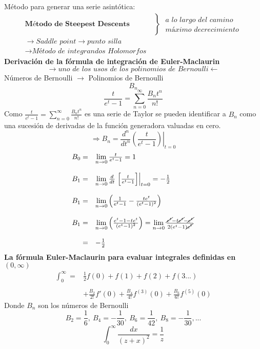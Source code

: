 \documentclass{article}
\theoremstyle{definition}
\begin{document}
Método para generar una serie asintótica:
\[\begin{array}{ll}
	\textbf{Método de Steepest Descents}
	&\left\}\begin{array}{ll}
		\textit{a lo largo del camino}\\
		\textit{máximo decrecimiento}	
	\end{array}\right.\\
	\to \textit{Saddle point}\to \textit{punto silla}\\
	\to \textit{Método de integrandos Holomorfos}
\end{array}\]
\textbf{Derivación de la fórmula de integración de Euler-Maclaurin}
\[\longrightarrow \textit{uno de los usos de los polinomios de Bernoulli}\longleftarrow\]
Números de Bernoulli $\longrightarrow$ Polinomios de Bernoulli
\[B_n\]
\[\frac{t}{e^t-1}=\sum^{\infty}_{n=0}\frac{B_nt^n}{n!}\]
Como $\frac{t}{e^t-1}=\sum^{\infty}_{n=0}\frac{B_nt^n}{n!}$ es una serie de Taylor se pueden identificar a $B_n$ como una sucesión de derivadas de la función generadora valuadas en cero.
\[\Rightarrow B_n=\frac{d^n}{dt^n}\left.\left(\frac{t}{e^t-1}\right)\right|_{t=0}\]
\[
\begin{array}{rl}
	B_0=&\lim\limits_{n\to 0}\frac{t}{e^t-1}=1\\
	\\
	B_1=&\lim\limits_{n\to 0}\frac{d}{dt}\left.\left[\frac{t}{e^t-1}\right]\right|_{t=0}=-\frac{1}{2}\\
	\\
	B_1=& \lim\limits_{n\to 0}\left(\frac{1}{e^t-1}-\frac{te^t}{(e^t-1)^2}\right)\\
	\\
	B_1=& \lim\limits_{n\to 0}\left(\frac{e^t-1-te^t}{(e^t-1)^2}\right)=\lim\limits_{n\to 0}\frac{\cancel{e^t}-t\cancel{e^t}-\cancel{e^t}}{2(e^t-1)\cancel{e^t}}\\
	\\
	=& -\frac{1}{2}
\end{array}\]
\textbf{La fórmula Euler-Maclaurin para evaluar integrales definidas en $(0,\infty)$}
\[
\begin{array}{rl}
	\int^{\infty}_0=&\frac{1}{2}f(0)+f(1)+f(2)+f(3...)\\
	\\
	&+\frac{B_2}{2!}f'(0)+\frac{B_4}{4!}f^{(3)}(0)+\frac{B_6}{6!}f^{(5)}(0)
\end{array}\]
Donde $B_n$ son los números de Bernoulli
\[B_2=\frac{1}{6},\ B_4=-\frac{1}{30},\ B_6=\frac{1}{42},\ B_8=-\frac{1}{30},...\]
\[\int^{\infty}_0\frac{dx}{(z+x)^2}=\frac{1}{z}\]
\end{document}

